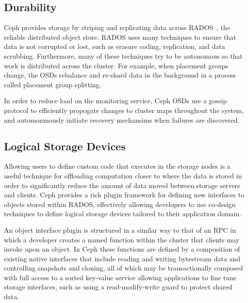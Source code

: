 \documentclass[10pt,twocolumn]{article}
\begin{document}
\subsection{Durability}
\label{sec:durability}

Ceph provides storage by striping and replicating data across
RADOS~\cite{weil_rados_2007}, the reliable distributed object store. RADOS
uses many techniques to ensure that data is not corrupted or lost, such as
erasure coding, replication, and data scrubbing. Furthermore, many of these
techniques try to be autonomous so that work is distributed across the
cluster. For example, when placement groups change, the OSDs rebalance and
re-shard data in the background in a process called placement group splitting.

In order to reduce load on the monitoring service, Ceph OSDs use a gossip
protocol to efficiently propogate changes to cluster maps throughout the
system, and automonmously initiate recovery mechansims when failures are
discovered.

\subsection{Logical Storage Devices}
\label{active-storage}

Allowing users to define custom code that executes in the storage nodes is a 
useful technique for offloading computation closer to where the data is stored 
in order to significantly reduce the amount of data moved between storage 
servers and clients. Ceph provides a rich plugin framework for defining new 
interfaces to objects
stored within RADOS, effectively allowing developers to use co-design
techniques to define logical storage devices tailored to their application
domain.

An object interface plugin is structured in a similar way to that of an RPC in
which a developer creates a named function within the cluster that clients may
invoke upon an object. In Ceph these functions are defined by a composition of
existing native interfaces that include reading and writing bytestream data
and controlling snapshots and cloning, all of which may be transactionally
composed with full access to a sorted key-value service allowing applications
to fine tune storage interfaces, such as using a read-modify-write guard to
protect shared data.
\end{document}
